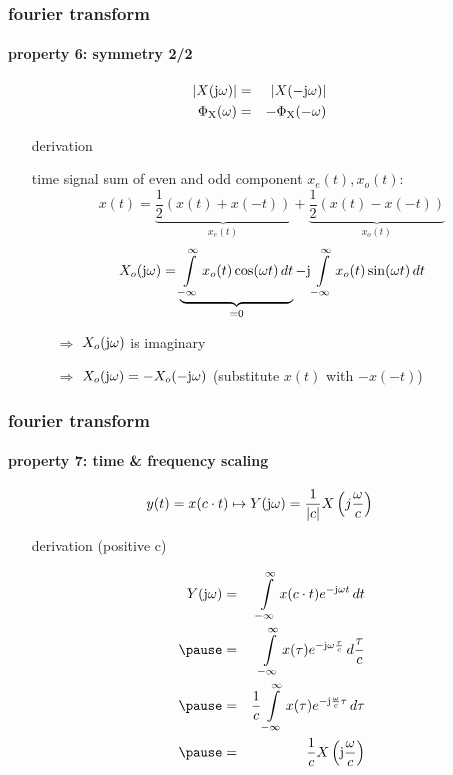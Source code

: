 	\begin{frame}\frametitle[allowframebreaks]{fourier transform}\framesubtitle{property 6: symmetry 2/2}
		\begin{eqnarray}
			|X(\mathrm{j}\omega)| &=& |X(-\mathrm{j}\omega)|\\
			\Phi_\mathrm{X}(\omega) &=& -\Phi_\mathrm{X}(-\omega) 
		\end{eqnarray}
		\pause
		\vspace{-5mm}
		\begin{itemize}
			\item[]	derivation
			
			\begin{footnotesize}
				time signal sum of even and odd component $x_e(t), x_o(t)$:
				\begin{equation}
					x(t) = \underbrace{\frac{1}{2}(x(t) + x(-t))}_{x_e(t)} + \underbrace{\frac{1}{2}(x(t) - x(-t))}_{x_o(t)} 
				\end{equation}
				\pause
				\begin{equation}
					X_o(\mathrm{j}\omega) = \underbrace{\int\limits_{-\infty}^{\infty}{x_o(t)\cos(\omega t)\,dt}}_{=0} - \mathrm{j} \int\limits_{-\infty}^{\infty}{x_o(t)\sin(\omega t)\,dt} \nonumber
				\end{equation}
				\pause
		\vspace{-5mm}
				\begin{itemize}
					\item[$\Rightarrow$]	$X_o(\mathrm{j}\omega)$ is imaginary
					\item[$\Rightarrow$]	$X_o(\mathrm{j}\omega) = -X_o(-\mathrm{j}\omega)$ (substitute $x(t)$ with $-x(-t)$)
				\end{itemize}
			\end{footnotesize}
		\end{itemize}
	\end{frame}	

	\begin{frame}\frametitle{fourier transform}\framesubtitle{property 7: time \& frequency scaling}
				\begin{equation}
					y(t) = x(c\cdot t) \mapsto Y(\mathrm{j}\omega) = \frac{1}{|c|}X\left(j\frac{\omega}{c}\right) 
				\end{equation}
		\pause
		\begin{itemize}
			\item[]	derivation (positive c)
			\begin{footnotesize}
				\begin{eqnarray}
					Y(\jom) &=& \int\limits_{-\infty}^{\infty} {x(c\cdot t) \e^{-\jom t}\, dt}\nonumber\\
					\pause
					&=& \int\limits_{-\infty}^{\infty} {x(\tau) \e^{-\jom \frac{\tau}{c}}\, d\frac{\tau}{c}}\nonumber\\
					\pause
					&=& \frac{1}{c}\int\limits_{-\infty}^{\infty} {x(\tau) \e^{-\mathrm{j} \frac{\omega}{c} \tau}\, d\tau}\nonumber\\
					\pause
					&=& \frac{1}{c} X\left(\mathrm{j}\frac{\omega}{c}\right) \nonumber
				\end{eqnarray}
			\end{footnotesize}
		\end{itemize}
	\end{frame}	

